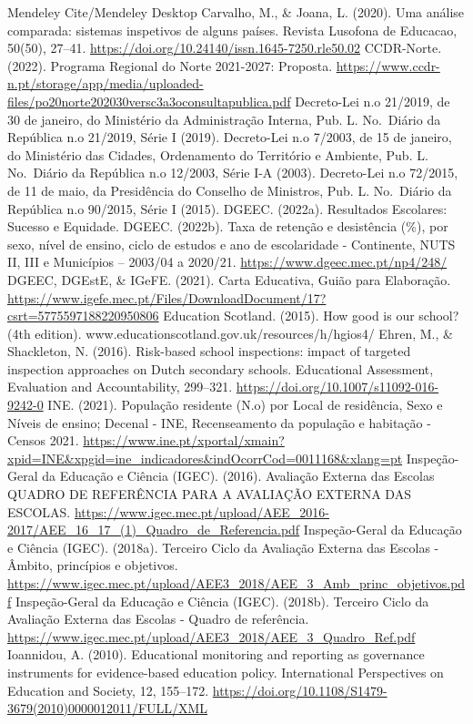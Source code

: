 \documentclass[
]{book}
\begin{document}
Mendeley Cite/Mendeley Desktop
Carvalho, M., \& Joana, L. (2020). Uma análise comparada: sistemas inspetivos de alguns países. Revista Lusofona de Educacao, 50(50), 27--41. \url{https://doi.org/10.24140/issn.1645-7250.rle50.02}
CCDR-Norte. (2022). Programa Regional do Norte 2021-2027: Proposta. \url{https://www.ccdr-n.pt/storage/app/media/uploaded-files/po20norte202030versc3a3oconsultapublica.pdf}
Decreto-Lei n.o 21/2019, de 30 de janeiro, do Ministério da Administração Interna, Pub. L. No.~Diário da República n.o 21/2019, Série I (2019).
Decreto-Lei n.o 7/2003, de 15 de janeiro, do Ministério das Cidades, Ordenamento do Território e Ambiente, Pub. L. No.~Diário da República n.o 12/2003, Série I-A (2003).
Decreto-Lei n.o 72/2015, de 11 de maio, da Presidência do Conselho de Ministros, Pub. L. No.~Diário da República n.o 90/2015, Série I (2015).
DGEEC. (2022a). Resultados Escolares: Sucesso e Equidade.
DGEEC. (2022b). Taxa de retenção e desistência (\%), por sexo, nível de ensino, ciclo de estudos e ano de escolaridade - Continente, NUTS II, III e Municípios -- 2003/04 a 2020/21. \url{https://www.dgeec.mec.pt/np4/248/}
DGEEC, DGEstE, \& IGeFE. (2021). Carta Educativa, Guião para Elaboração. \url{https://www.igefe.mec.pt/Files/DownloadDocument/17?csrt=5775597188220950806}
Education Scotland. (2015). How good is our school? (4th edition). www.educationscotland.gov.uk/resources/h/hgios4/
Ehren, M., \& Shackleton, N. (2016). Risk-based school inspections: impact of targeted inspection approaches on Dutch secondary schools. Educational Assessment, Evaluation and Accountability, 299--321. \url{https://doi.org/10.1007/s11092-016-9242-0}
INE. (2021). População residente (N.o) por Local de residência, Sexo e Níveis de ensino; Decenal - INE, Recenseamento da população e habitação - Censos 2021. \url{https://www.ine.pt/xportal/xmain?xpid=INE\&xpgid=ine_indicadores\&indOcorrCod=0011168\&xlang=pt}
Inspeção-Geral da Educação e Ciência (IGEC). (2016). Avaliação Externa das Escolas QUADRO DE REFERÊNCIA PARA A AVALIAÇÃO EXTERNA DAS ESCOLAS. \url{https://www.igec.mec.pt/upload/AEE_2016-2017/AEE_16_17_(1)_Quadro_de_Referencia.pdf}
Inspeção-Geral da Educação e Ciência (IGEC). (2018a). Terceiro Ciclo da Avaliação Externa das Escolas - Âmbito, princípios e objetivos. \url{https://www.igec.mec.pt/upload/AEE3_2018/AEE_3_Amb_princ_objetivos.pdf}
Inspeção-Geral da Educação e Ciência (IGEC). (2018b). Terceiro Ciclo da Avaliação Externa das Escolas - Quadro de referência. \url{https://www.igec.mec.pt/upload/AEE3_2018/AEE_3_Quadro_Ref.pdf}
Ioannidou, A. (2010). Educational monitoring and reporting as governance instruments for evidence-based education policy. International Perspectives on Education and Society, 12, 155--172. \url{https://doi.org/10.1108/S1479-3679(2010)0000012011/FULL/XML}
\end{document}
